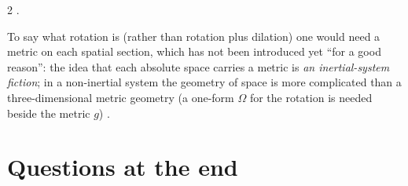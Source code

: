 \begin{paracol}{2}
.
\begin{aside}
To say what rotation is (rather than rotation plus dilation) one would need a metric on each spatial section, which has not been introduced yet ``for a good reason'': the idea that each absolute space carries a metric is \emph{an inertial-system fiction}; in a non-inertial system the geometry of space is more complicated than a three-dimensional metric geometry (a one-form $\Omega$ for the rotation is needed beside the metric $g$) .
\end{aside}

\section{Questions at the end}\label{sec:c09-questions}


\end{paracol}

